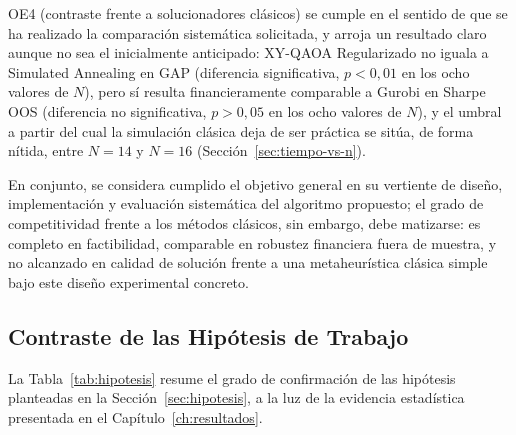 OE4 (contraste frente a solucionadores clásicos) se cumple en el sentido de que se ha realizado la comparación
sistemática solicitada, y arroja un resultado claro aunque no sea el inicialmente anticipado: XY-QAOA
Regularizado no iguala a Simulated Annealing en GAP (diferencia significativa, $p<0{,}01$ en los ocho valores de
$N$), pero sí resulta financieramente comparable a Gurobi en Sharpe OOS (diferencia no significativa,
$p>0{,}05$ en los ocho valores de $N$), y el umbral a partir del cual la simulación clásica deja de ser práctica
se sitúa, de forma nítida, entre $N=14$ y $N=16$ (Sección~\ref{sec:tiempo-vs-n}).

En conjunto, se considera cumplido el objetivo general en su vertiente de diseño, implementación y evaluación
sistemática del algoritmo propuesto; el grado de competitividad frente a los métodos clásicos, sin embargo, debe
matizarse: es completo en factibilidad, comparable en robustez financiera fuera de muestra, y no alcanzado en
calidad de solución frente a una metaheurística clásica simple bajo este diseño experimental concreto.

\subsection{Contraste de las Hipótesis de Trabajo}

La Tabla~\ref{tab:hipotesis} resume el grado de confirmación de las hipótesis planteadas en la
Sección~\ref{sec:hipotesis}, a la luz de la evidencia estadística presentada en el Capítulo~\ref{ch:resultados}.


